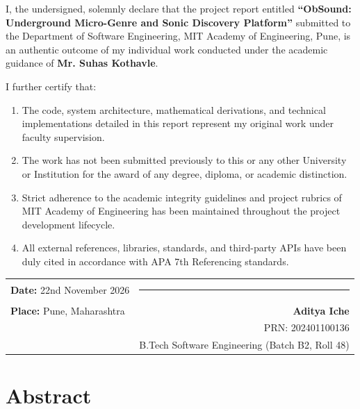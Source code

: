 \documentclass[12pt,a4paper,oneside]{report}
\begin{document}
\noindent I, the undersigned, solemnly declare that the project report entitled \textbf{``ObSound: Underground Micro-Genre and Sonic Discovery Platform''} submitted to the Department of Software Engineering, MIT Academy of Engineering, Pune, is an authentic outcome of my individual work conducted under the academic guidance of \textbf{Mr. Suhas Kothavle}.

\vspace{0.4cm}
\noindent I further certify that:
\begin{enumerate}[label=\arabic*.]
    \item The code, system architecture, mathematical derivations, and technical implementations detailed in this report represent my original work under faculty supervision.
    \item The work has not been submitted previously to this or any other University or Institution for the award of any degree, diploma, or academic distinction.
    \item Strict adherence to the academic integrity guidelines and project rubrics of MIT Academy of Engineering has been maintained throughout the project development lifecycle.
    \item All external references, libraries, standards, and third-party APIs have been duly cited in accordance with APA 7th Referencing standards.
\end{enumerate}

\vspace{2.0cm}
\noindent
\begin{tabular*}{\textwidth}{@{\extracolsep{\fill}}lr}
\textbf{Date:} 22nd November 2026 & \rule{5.0cm}{0.4pt} \\
\textbf{Place:} Pune, Maharashtra & \textbf{Aditya Iche} \\
& PRN: 202401100136 \\
& B.Tech Software Engineering (Batch B2, Roll 48) \\
\end{tabular*}

\clearpage

\chapter*{Abstract}
\end{document}
